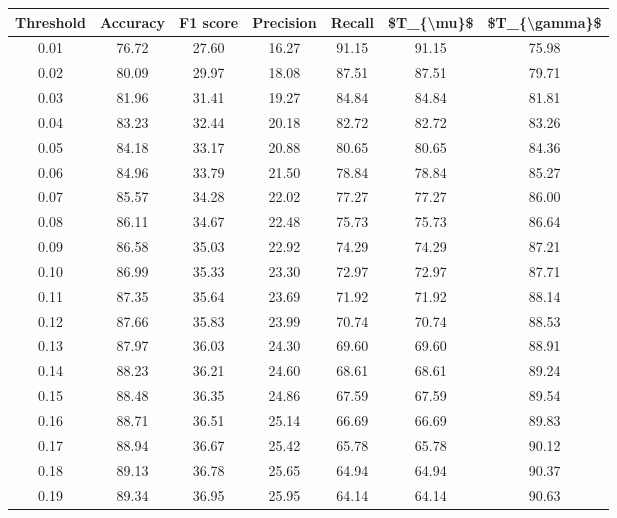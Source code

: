\begin{tabular}{|c|c|c|c|c|c|c|}
\hline
 Threshold &  Accuracy &  F1 score &  Precision &  Recall &  \$T\_\{\textbackslash mu\}\$ &  \$T\_\{\textbackslash gamma\}\$ \\
\hline
      0.01 &     76.72 &     27.60 &      16.27 &   91.15 &      91.15 &         75.98 \\
      0.02 &     80.09 &     29.97 &      18.08 &   87.51 &      87.51 &         79.71 \\
      0.03 &     81.96 &     31.41 &      19.27 &   84.84 &      84.84 &         81.81 \\
      0.04 &     83.23 &     32.44 &      20.18 &   82.72 &      82.72 &         83.26 \\
      0.05 &     84.18 &     33.17 &      20.88 &   80.65 &      80.65 &         84.36 \\
      0.06 &     84.96 &     33.79 &      21.50 &   78.84 &      78.84 &         85.27 \\
      0.07 &     85.57 &     34.28 &      22.02 &   77.27 &      77.27 &         86.00 \\
      0.08 &     86.11 &     34.67 &      22.48 &   75.73 &      75.73 &         86.64 \\
      0.09 &     86.58 &     35.03 &      22.92 &   74.29 &      74.29 &         87.21 \\
      0.10 &     86.99 &     35.33 &      23.30 &   72.97 &      72.97 &         87.71 \\
      0.11 &     87.35 &     35.64 &      23.69 &   71.92 &      71.92 &         88.14 \\
      0.12 &     87.66 &     35.83 &      23.99 &   70.74 &      70.74 &         88.53 \\
      0.13 &     87.97 &     36.03 &      24.30 &   69.60 &      69.60 &         88.91 \\
      0.14 &     88.23 &     36.21 &      24.60 &   68.61 &      68.61 &         89.24 \\
      0.15 &     88.48 &     36.35 &      24.86 &   67.59 &      67.59 &         89.54 \\
      0.16 &     88.71 &     36.51 &      25.14 &   66.69 &      66.69 &         89.83 \\
      0.17 &     88.94 &     36.67 &      25.42 &   65.78 &      65.78 &         90.12 \\
      0.18 &     89.13 &     36.78 &      25.65 &   64.94 &      64.94 &         90.37 \\
      0.19 &     89.34 &     36.95 &      25.95 &   64.14 &      64.14 &         90.63 \\

\end{tabular}
